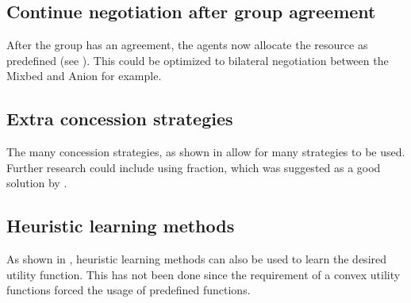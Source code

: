 \subsection{Continue negotiation after group agreement}
After the group has an agreement, the agents now allocate the resource as predefined (see ). This could be optimized to bilateral negotiation between the Mixbed and Anion for example.
\subsection{Extra concession strategies}
The many concession strategies, as shown in  allow for many strategies to be used. Further research could include using fraction, which was suggested as a good solution by \citet{wu2009efficient}. 
\subsection{Heuristic learning methods}
As shown in , heuristic learning methods can also be used to learn the desired utility function. This has not been done since the requirement of a convex utility functions forced the usage of predefined functions.
\todos
